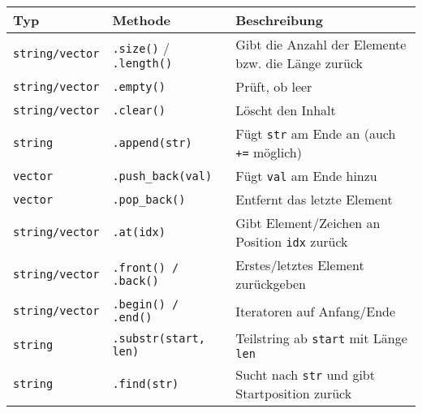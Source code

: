 \documentclass[10pt, a3paper, landscape]{article}
\begin{document}
\begin{multicols*}{4}
\noindent
\begin{tabularx}{\linewidth}{l l >{\RaggedRight}X}
\toprule
\textbf{Typ} & \textbf{Methode} & \textbf{Beschreibung} \\
\midrule
\texttt{string/vector} & \lstinline|.size()| / \lstinline|.length()| & Gibt die Anzahl der Elemente bzw. die Länge zurück \\
\texttt{string/vector} & \lstinline|.empty()| & Prüft, ob leer \\
\texttt{string/vector} & \lstinline|.clear()| & Löscht den Inhalt \\
\texttt{string} & \lstinline|.append(str)| & Fügt \lstinline|str| am Ende an (auch \lstinline|+=| möglich) \\
\texttt{vector} & \lstinline|.push_back(val)| & Fügt \lstinline|val| am Ende hinzu \\
\texttt{vector} & \lstinline|.pop_back()| & Entfernt das letzte Element \\
\texttt{string/vector} & \lstinline|.at(idx)| & Gibt Element/Zei­chen an Position \lstinline|idx| zurück \\
\texttt{string/vector} & \lstinline|.front() / .back()| & Erstes/letztes Element zurückgeben \\
\texttt{string/vector} & \lstinline|.begin() / .end()| & Iteratoren auf Anfang/Ende \\
\texttt{string} & \lstinline|.substr(start, len)| & Teilstring ab \lstinline|start| mit Länge \lstinline|len| \\
\texttt{string} & \lstinline|.find(str)| & Sucht nach \lstinline|str| und gibt Startposition zurück \\
\bottomrule
\end{tabularx}


\end{multicols*}
\end{document}
